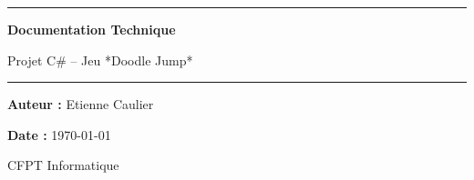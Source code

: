 \documentclass[french]{article}
\begin{document}
\begin{titlepage}
	\centering
	\vspace*{2cm}
	{\color{blue}\rule{\textwidth}{1.5pt}}\par
	\vspace{1cm}

	{\Huge\bfseries Documentation Technique\par}
	\vspace{0.5cm}
	{\Large Projet C\# – Jeu *Doodle Jump*\par}

	\vspace{1cm}
	{\color{blue}\rule{0.6\textwidth}{1pt}}\par
	\vspace{2cm}

	{\Large \textbf{Auteur :} Etienne Caulier \par}
	\vspace{0.5cm}
	{\Large \textbf{Date :} \today \par}

	\vfill


	\vspace{1cm}
	{\large CFPT Informatique \par}

	\vspace*{2cm}
\end{titlepage}


\tableofcontents
\newpage

\end{document}
